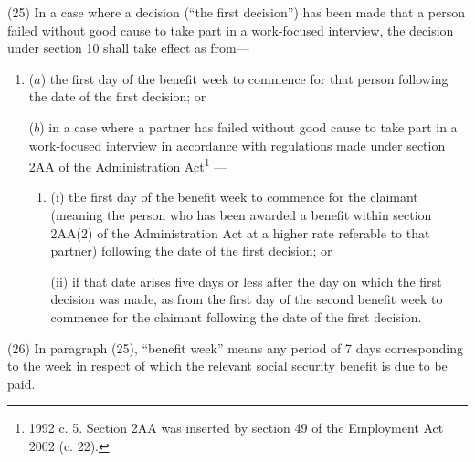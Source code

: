 \documentclass[12pt,a4paper]{article}
\begin{document}
(25) In a case where a decision (“the first decision”) has been made that a person failed without good cause to take part in a work-focused interview, the decision under section 10 shall take effect as from—
\begin{enumerate}\item[]
($a$) the first day of the benefit week to commence for that person following the date of the first decision; or

($b$) in a case where a partner has failed without good cause to take part in a work-focused interview 
in accordance with regulations made under section 2AA of the Administration Act\footnote{1992 c. 5. Section 2AA was inserted by section 49 of the Employment Act 2002 (c. 22).}%
—
\begin{enumerate}\item[]
(i) the first day of the benefit week to commence for the claimant 
(meaning the person who has been awarded a benefit within section 2AA(2) of the Administration Act at a higher rate referable to that partner)  %
following the date of the first decision; or

(ii) if that date arises five days or less after the day on which the first decision was made, as from the first day of the second benefit week to commence for the claimant following the date of the first decision.
\end{enumerate}
\end{enumerate}

(26) In paragraph (25), “benefit week” means any period of 7 days corresponding to the week in respect of which the relevant social security benefit is due to be paid.
\end{document}
